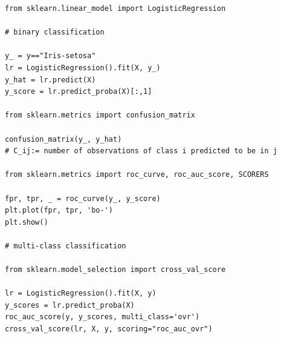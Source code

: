 \documentclass[]{article}
\begin{document}
\begin{lstlisting}
from sklearn.linear_model import LogisticRegression

# binary classification

y_ = y=="Iris-setosa"
lr = LogisticRegression().fit(X, y_)
y_hat = lr.predict(X)
y_score = lr.predict_proba(X)[:,1]

from sklearn.metrics import confusion_matrix

confusion_matrix(y_, y_hat)
# C_ij:= number of observations of class i predicted to be in j

from sklearn.metrics import roc_curve, roc_auc_score, SCORERS

fpr, tpr, _ = roc_curve(y_, y_score)
plt.plot(fpr, tpr, 'bo-')
plt.show()

# multi-class classification

from sklearn.model_selection import cross_val_score

lr = LogisticRegression().fit(X, y)
y_scores = lr.predict_proba(X)
roc_auc_score(y, y_scores, multi_class='ovr')
cross_val_score(lr, X, y, scoring="roc_auc_ovr")
\end{lstlisting}
\end{document}
